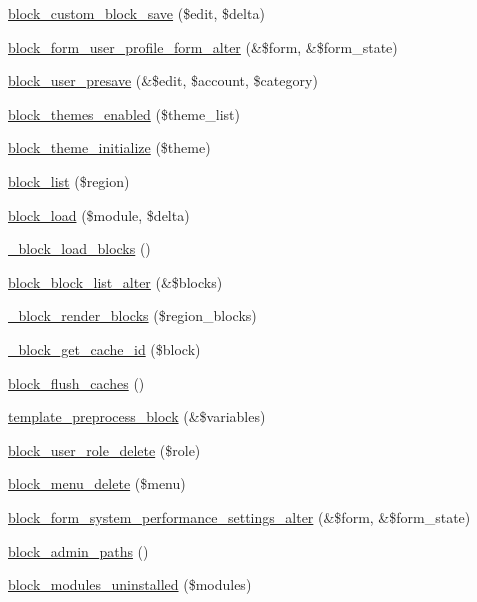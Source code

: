 \begin{DoxyCompactItemize}
\hyperlink{block_8module_ad1db1c6a44b79bb7d62dc07d6cfd60b8}{block\_\-custom\_\-block\_\-save} (\$edit, \$delta)
\item 
\hyperlink{block_8module_a949dd339f782c50a64b0fb7e1c55b7b2}{block\_\-form\_\-user\_\-profile\_\-form\_\-alter} (\&\$form, \&\$form\_\-state)
\item 
\hyperlink{block_8module_a22658a5cc41804828703ddbad204bb24}{block\_\-user\_\-presave} (\&\$edit, \$account, \$category)
\item 
\hyperlink{block_8module_a86c6b09110f9a12b4c166e8a1cea05ef}{block\_\-themes\_\-enabled} (\$theme\_\-list)
\item 
\hyperlink{block_8module_a0636648d3f8f3e32a8fb37becc70cbff}{block\_\-theme\_\-initialize} (\$theme)
\item 
\hyperlink{block_8module_a38999f916243ed473763738bddea9a6b}{block\_\-list} (\$region)
\item 
\hyperlink{block_8module_a560c20e523332fac0268b48a530ae3e8}{block\_\-load} (\$module, \$delta)
\item 
\hyperlink{block_8module_aade0870d32f13ad930bffc6630945029}{\_\-block\_\-load\_\-blocks} ()
\item 
\hyperlink{block_8module_aa38c3faa83302a05ec260a6874e745d8}{block\_\-block\_\-list\_\-alter} (\&\$blocks)
\item 
\hyperlink{block_8module_ab438e3719fd799bebc21e18678b42d91}{\_\-block\_\-render\_\-blocks} (\$region\_\-blocks)
\item 
\hyperlink{block_8module_af008f1e1e134d730b902c97052e67f59}{\_\-block\_\-get\_\-cache\_\-id} (\$block)
\item 
\hyperlink{block_8module_ad7211d9a517eea4580815ed204b6b790}{block\_\-flush\_\-caches} ()
\item 
\hyperlink{block_8module_af4bcb538ddb98ffdd9ec8037631f10fa}{template\_\-preprocess\_\-block} (\&\$variables)
\item 
\hyperlink{block_8module_a91a7dcf5c56bd33c0be56227eae1d02e}{block\_\-user\_\-role\_\-delete} (\$role)
\item 
\hyperlink{block_8module_a983fd0daa9cbbe841a5daedf876e4ee2}{block\_\-menu\_\-delete} (\$menu)
\item 
\hyperlink{block_8module_a674b0bc16a35cb4e870657d37eec9c57}{block\_\-form\_\-system\_\-performance\_\-settings\_\-alter} (\&\$form, \&\$form\_\-state)
\item 
\hyperlink{block_8module_a0fe798e9084f510c0f8712c2a6ecf0ef}{block\_\-admin\_\-paths} ()
\item 
\hyperlink{block_8module_a0cbbdff96f480240a42c0951a00e52dc}{block\_\-modules\_\-uninstalled} (\$modules)
\end{DoxyCompactItemize}


